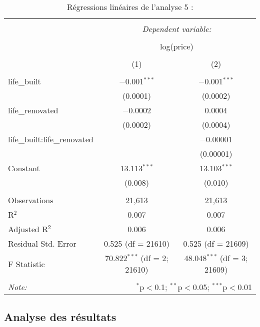 \documentclass[
  11pt,
  french,
]{article}
\begin{document}
\begin{table}[!htbp] \centering 
  \caption{Régressions linéaires de l'analyse 5 :} 
  \label{} 
\small 
\begin{tabular}{@{\extracolsep{1pt}}lcc} 
\\[-1.8ex]\hline 
\hline \\[-1.8ex] 
 & \multicolumn{2}{c}{\textit{Dependent variable:}} \\ 
\cline{2-3} 
\\[-1.8ex] & \multicolumn{2}{c}{log(price)} \\ 
\\[-1.8ex] & (1) & (2)\\ 
\hline \\[-1.8ex] 
 life\_built & $-$0.001$^{***}$ & $-$0.001$^{***}$ \\ 
  & (0.0001) & (0.0002) \\ 
  life\_renovated & $-$0.0002 & 0.0004 \\ 
  & (0.0002) & (0.0004) \\ 
  life\_built:life\_renovated &  & $-$0.00001 \\ 
  &  & (0.00001) \\ 
  Constant & 13.113$^{***}$ & 13.103$^{***}$ \\ 
  & (0.008) & (0.010) \\ 
 \hline \\[-1.8ex] 
Observations & 21,613 & 21,613 \\ 
R$^{2}$ & 0.007 & 0.007 \\ 
Adjusted R$^{2}$ & 0.006 & 0.006 \\ 
Residual Std. Error & 0.525 (df = 21610) & 0.525 (df = 21609) \\ 
F Statistic & 70.822$^{***}$ (df = 2; 21610) & 48.048$^{***}$ (df = 3; 21609) \\ 
\hline 
\hline \\[-1.8ex] 
\textit{Note:}  & \multicolumn{2}{r}{$^{*}$p$<$0.1; $^{**}$p$<$0.05; $^{***}$p$<$0.01} \\ 
\end{tabular} 
\end{table}

\newpage

\hypertarget{analyse-des-ruxe9sultats-5}{%
\subsection{Analyse des résultats}\label{analyse-des-ruxe9sultats-5}}
\end{document}
